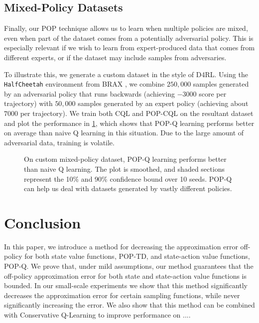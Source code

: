 \subsection{Mixed-Policy Datasets}

Finally, our POP technique allows us to learn when multiple policies are mixed, even when part of the dataset comes from a potentially adversarial policy. This is especially relevant if we wish to learn from expert-produced data that comes from different experts, or if the dataset may include samples from adversaries.

To illustrate this, we generate a custom dataset in the style of D4RL. Using the \texttt{HalfCheetah} environment from BRAX \citep{brax2021github}, we combine $250,000$ samples generated by an adversarial policy that runs backwards (achieving $-3000$ score per trajectory) with $50,000$ samples generated by an expert policy (achieving about $7000$ per trajectory). We train both CQL and POP-CQL on the resultant dataset and plot the performance in \cref{fig:fwdback}, which shows that POP-Q learning performs better on average than naive Q learning in this situation. Due to the large amount of adversarial data, training is volatile.

\begin{figure}[t]
  \centering
  
  \caption{
    On custom mixed-policy dataset, POP-Q learning performs better than naive Q learning. The plot is smoothed, and shaded sections represent the 10\% and 90\% confidence bound over 10 seeds. POP-Q can help us deal with datasets generated by vastly different policies.
  }
  \label{fig:fwdback}
\end{figure}

\section{Conclusion}
In this paper, we introduce a method for decreasing the approximation error off-policy for both state value functions, POP-TD, and state-action value functions, POP-Q.
We prove that, under mild assumptions, our method guarantees that the off-policy approximation error for both state and state-action value functions is bounded.
In our small-scale experiments we show that this method significantly decreases the approximation error for certain sampling functions, while never significantly increasing the error.
We also show that this method can be combined with Conservative Q-Learning to improve performance on ....


